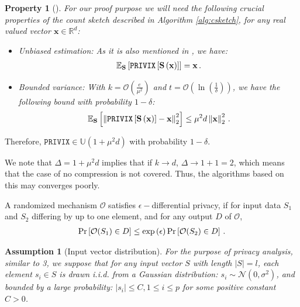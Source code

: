 \documentclass[review,onefignum,onetabnum]{siamart190516}
\newtheorem{property}{Property}
\newtheorem{assumption}{Assumption}
\begin{document}
\begin{property}[\cite{li2019privacy}]
For our proof purpose we will need the following crucial properties of the count sketch described in Algorithm \ref{alg:csketch}, for any real valued vector $\mathbf{x}\in \mathbb{R}^{d}$:
\begin{itemize}
    \item[1)] \emph{Unbiased estimation}: As it is also mentioned in \cite{li2019privacy}, we have:
    \begin{align}\notag
        \mathbb{E}_{\mathbf{S}}\left[\texttt{PRIVIX}\left[\mathbf{S}\left(\mathbf{x}\right)\right]\right]=\mathbf{x}\, .
    \end{align}
    \item[2)] \emph{Bounded variance}: With $k=\mathcal{O}\left(\frac{e}{\mu^2}\right)$ and $t=\mathcal{O}\left(\ln \left(\frac{1}{\delta}\right)\right)$, we have the following bound with probability $1-\delta$:
    \begin{align}\notag
        \mathbb{E}_{\mathbf{S}}\left[\left\|\texttt{PRIVIX}\left[\mathbf{S}\left(\mathbf{x}\right)\right]-\mathbf{x}\right\|_2^2\right]\leq \mu^2 d\left\|\mathbf{x}\right\|_2^2\, .
    \end{align}
\end{itemize}
\end{property}
Therefore, $\texttt{PRIVIX}\in \mathbb{U}(1+\mu^2 d)$ with probability $1-\delta$.
\begin{remark}
We note that $\Delta=1+\mu^2d$ implies that if $k\rightarrow d$, $\Delta\rightarrow 1+1=2$, which means that the case of no compression is not covered. Thus, the algorithms based on this may converges poorly.
\end{remark}

\begin{definition}
A randomized mechanism $\mathcal{O}$ satisfies $\epsilon-$differential privacy, if for input data ${S}_1$ and ${S}_2$ differing by up to one element, and for any output $D$ of $\mathcal{O}$,
\begin{align}\notag
    \Pr\left[\mathcal{O}(S_1)\in D\right]\leq \exp{\left(\epsilon\right)}\Pr\left[\mathcal{O}(S_2)\in D\right] \, .
\end{align}
\end{definition}


\begin{assumption}[Input vector distribution]\label{assu:invecdist}
For the purpose of privacy analysis, similar to 3, we suppose that for any input vector $S$ with length $|S|=l$, each element $s_i\in S$ is drawn i.i.d. from a Gaussian distribution: $s_i\sim \mathcal{N}(0,\sigma^2)$, and bounded by a large probability:  $|s_i|\leq C, 1\leq i\leq p$ for some positive constant $C>0$.    
\end{assumption}
\end{document}
